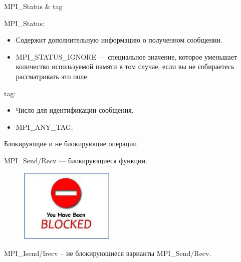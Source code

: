 \documentclass{beamer}
\begin{document}
\begin{frame}{MPI_Status \& tag}

MPI_Status:

\begin{itemize}
	\item Содержит дополнительную информацию о полученном сообщении.
	\item MPI_STATUS_IGNORE --- специальное значение, которое уменьшает количество используемой памяти в том случае, если вы не собираетесь рассматривать это поле.
\end{itemize}

\vfill

tag:

\begin{itemize}
	\item Число для идентификации сообщения,
	\item MPI_ANY_TAG.
\end{itemize}

\end{frame}

\begin{frame}{Блокирующие и не блокирующие операции}

MPI_Send/Recv --- блокирующиеся функции.

\begin{figure}[htp]
	\centering
	\includegraphics[width=0.4\textwidth]{blocked}
\end{figure}

MPI_Isend/Irecv – не блокирующиеся варианты MPI_Send/Recv.

\end{frame}


\end{document}

